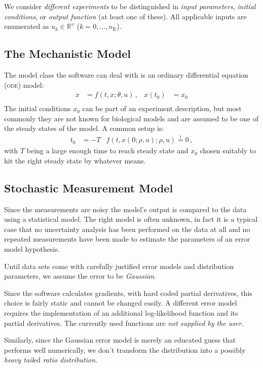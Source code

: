 \documentclass[utf8,english,DIV=12,12pt]{scrartcl}
\newcommand{\ode}{\textsc{ode}}
\begin{document}
We consider \emph{different experiments} to be distinguished in
\emph{input parameters}, \emph{initial conditions}, or \emph{output
  function} (at least one of these). All applicable inputs are
enumerated as $u_k\in\mathbb{R}^\upsilon$ ($k=0,\dots,n_{\text{E}}$).

\subsection{The Mechanistic Model}
\label{sec:ODE}

The model class the software can deal with is an ordinary differential
equation (\ode) model:
\begin{align}
  \dot x &= f(t,x;\theta,u)\,,& x(t_0)&=x_0\\
\end{align}
The initial conditions $x_0$ can be part of an experiment description,
but most commonly they are not known for biological models and are
assumed to be one of the steady states of the model. A common setup is:
\begin{align}
  t_0&=-T&f(t,x(0;\rho,u);\rho,u)\overset{!}{=}0\,,
\end{align}
with $T$ being a large enough time to reach steady state and $x_0$
chosen suitably to hit the right steady state by whatever means.

\subsection{Stochastic Measurement Model}
\label{sec:out}

Since the measurements are noisy the model's output is compared to the
data using a statistical model. The right model is often unknown, in
fact it is a typical case that no uncertainty analysis has been
performed on the data at all and no repeated measurements have been
made to estimate the parameters of an error model hypothesis.

Until data sets come with carefully justified error models and
distribution parameters, we assume the error to be \emph{Gaussian}.

Since the software calculates gradients, with hard coded partial
derivatives, this choice is fairly static and cannot be changed
easily. A different error model requires the implementation of an
additional log-likelihood function and its partial derivatives. The
currently used functions are \emph{not supplied by the user}.

Similarly, since the Gaussian error model is merely an educated guess
that performs well numerically, we don't transform the distribution
into a possibly \emph{heavy tail}ed \emph{ratio distribution}.
\end{document}
